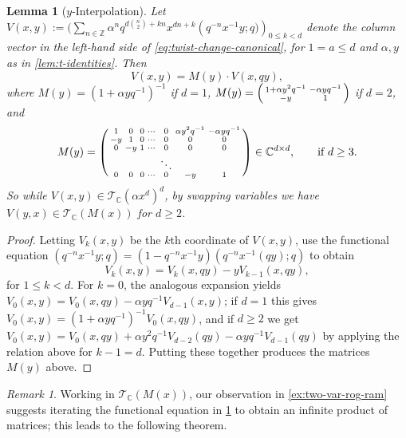 \documentclass[reqno,11pt]{amsart}
\newtheorem{lemma}[theorem]{Lemma}
\theoremstyle{definition}
\theoremstyle{remark}
\newtheorem*{remark}{Remark}
\numberwithin{equation}{section}
\newcommand{\Z}{\mathbb{Z}}
\newcommand{\C}{\mathbb{C}}
\newcommand{\mT}{\mathcal{T}}
\newenvironment{psmall}
  {\left(\begin{smallmatrix}}
  {\end{smallmatrix}\right)}
\begin{document}
\begin{lemma}[$y$-Interpolation] \label{lem:y-interpolation}
Let $V(x, y) := \big(
    \sum_{n \in \Z} \alpha^n q^{d\binom{n}{2}+kn} x^{dn+k} \left(q^{-n} x^{-1} y; q\big)
    \right)_{0 \le k < d}$ 
denote the column vector in the left-hand side of \cref{eq:twist-change-canonical}, for $1 = a \le d$ and $\alpha, y$ as in \cref{lem:t-identities}. Then
\[
    V(x, y)
    =
    M(y)
    \cdot
    V(x, qy),
\]
where $M(y) = \left(1 + \alpha y q^{-1}\right)^{-1}$ if $d = 1$, $M(y) = \begin{psmall}
    1 + \alpha y^2q^{-1} & -\alpha yq^{-1} \\
    -y & 1
    \end{psmall}$
if $d = 2$, and
\[
    M(y)
    =
    \begin{psmall}
    1 & 0 & 0 & \cdots & 0 & \alpha y^2q^{-1} & -\alpha yq^{-1} \\
    -y & 1 & 0 & \cdots & 0 & 0 & 0 \\
    0 & -y & 1 & \cdots & 0 & 0 & 0 \\
    & & & & \ddots & & \\
    0 & 0 & 0 & \cdots & 0 & -y & 1
    \end{psmall}
    \in 
    \C^{d \times d},
    \qquad 
    \text{if } d \ge 3.
\]
So while $V(x, y) \in \mT_\C\left(\alpha x^d\right)^d$, by swapping variables we have $V(y, x) \in \mT_\C\left(M(x)\right)$ for $d \ge 2$.
\end{lemma}
\begin{proof}
Letting $V_k(x, y)$ be the $k$th coordinate of $V(x, y)$, use the functional equation $\left(q^{-n} x^{-1} y; q\right) = \left(1 - q^{-n} x^{-1} y\right) \left(q^{-n} x^{-1} (qy); q\right)$ to obtain
\[
    V_k(x, y) = V_k(x, qy) - yV_{k-1}(x, qy),
\]
for $1 \le k < d$. For $k = 0$, the analogous expansion yields $V_0(x, y) = V_0(x, qy) - \alpha y q^{-1} V_{d-1}(x, y)$; if $d = 1$ this gives $V_0(x, y) = (1 + \alpha y q^{-1})^{-1} V_0(x, qy)$, and if $d \ge 2$ we get $V_0(x, y) = V_0(x, qy) + \alpha y^2 q^{-1} V_{d-2}(qy) - \alpha y q^{-1} V_{d-1}(qy)$ by applying the relation above for $k-1 = d$. Putting these together produces the matrices $M(y)$ above.
\end{proof}
\begin{remark}
Working in $\mT_\C\left(M(x)\right)$, our observation in \cref{ex:two-var-rog-ram} suggests iterating the functional equation in \cref{lem:y-interpolation} to obtain an infinite product of matrices; this leads to the following theorem.
\end{remark}
\end{document}
